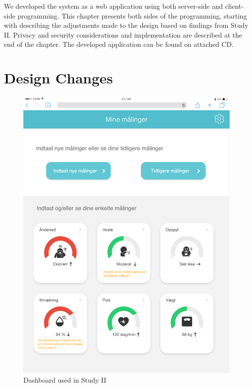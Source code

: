 We developed the system as a web application using both server-side and client-side programming. This chapter presents both sides of the programming, starting with describing the adjustments made to the design based on findings from Study II. Privacy and security considerations and implementation are described at the end of the chapter. The developed application can be found on attached CD.

\section{Design Changes}

\begin{figure}[h]
  \centering
  \begin{minipage}[b]{0.45\textwidth}
    \includegraphics[width=\textwidth]{images/study2/Dashboard.png}
    \caption{Dashboard used in Study II}
    \label{fig:db1st}
  \end{minipage}
  \hfill

\end{figure}
